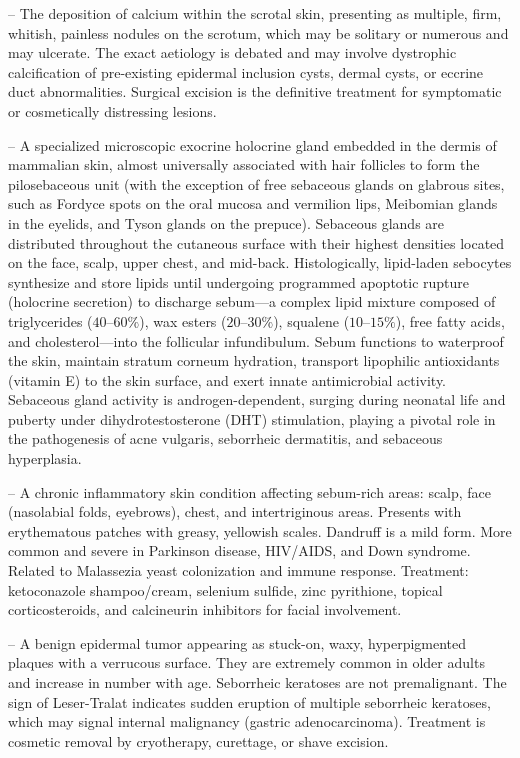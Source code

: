 -- The deposition of calcium within the scrotal skin, presenting as multiple, firm, whitish, painless nodules on the scrotum, which may be solitary or numerous and may ulcerate. The exact aetiology is debated and may involve dystrophic calcification of pre-existing epidermal inclusion cysts, dermal cysts, or eccrine duct abnormalities. Surgical excision is the definitive treatment for symptomatic or cosmetically distressing lesions.

-- A specialized microscopic exocrine holocrine gland embedded in the dermis of mammalian skin, almost universally associated with hair follicles to form the pilosebaceous unit (with the exception of free sebaceous glands on glabrous sites, such as Fordyce spots on the oral mucosa and vermilion lips, Meibomian glands in the eyelids, and Tyson glands on the prepuce). Sebaceous glands are distributed throughout the cutaneous surface with their highest densities located on the face, scalp, upper chest, and mid-back. Histologically, lipid-laden sebocytes synthesize and store lipids until undergoing programmed apoptotic rupture (holocrine secretion) to discharge sebum---a complex lipid mixture composed of triglycerides ($40\text{--}60\%$), wax esters ($20\text{--}30\%$), squalene ($10\text{--}15\%$), free fatty acids, and cholesterol---into the follicular infundibulum. Sebum functions to waterproof the skin, maintain stratum corneum hydration, transport lipophilic antioxidants (vitamin E) to the skin surface, and exert innate antimicrobial activity. Sebaceous gland activity is androgen-dependent, surging during neonatal life and puberty under dihydrotestosterone (DHT) stimulation, playing a pivotal role in the pathogenesis of acne vulgaris, seborrheic dermatitis, and sebaceous hyperplasia.

-- A chronic inflammatory skin condition affecting sebum-rich areas: scalp, face (nasolabial folds, eyebrows), chest, and intertriginous areas. Presents with erythematous patches with greasy, yellowish scales. Dandruff is a mild form. More common and severe in Parkinson disease, HIV/AIDS, and Down syndrome. Related to Malassezia yeast colonization and immune response. Treatment: ketoconazole shampoo/cream, selenium sulfide, zinc pyrithione, topical corticosteroids, and calcineurin inhibitors for facial involvement.

-- A benign epidermal tumor appearing as stuck-on, waxy, hyperpigmented plaques with a verrucous surface. They are extremely common in older adults and increase in number with age. Seborrheic keratoses are not premalignant. The sign of Leser-Tralat indicates sudden eruption of multiple seborrheic keratoses, which may signal internal malignancy (gastric adenocarcinoma). Treatment is cosmetic removal by cryotherapy, curettage, or shave excision.

